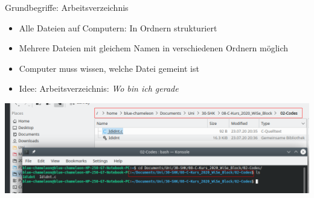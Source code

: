 
\begin{frame}{Grundbegriffe: Arbeitsverzeichnis}
%
\begin{itemize}
\item Alle Dateien auf Computern: In Ordnern strukturiert
\item Mehrere Dateien mit gleichem Namen in verschiedenen Ordnern möglich
\item Computer muss wissen, welche Datei gemeint ist
\item Idee: Arbeitsverzeichnis: \emph{Wo bin ich gerade}
\end{itemize}
%
\includegraphics[width=\linewidth]{./gfx/paths}
%
\end{frame}


